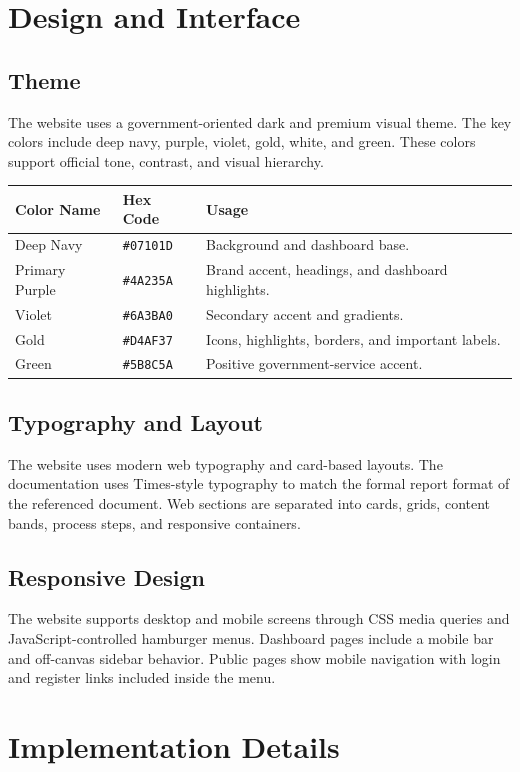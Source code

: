 \documentclass[12pt,a4paper]{report}
\begin{document}
\chapter{Design and Interface}
\section{Theme}
The website uses a government-oriented dark and premium visual theme. The key colors include deep navy, purple, violet, gold, white, and green. These colors support official tone, contrast, and visual hierarchy.

\begin{longtable}{|p{1.7in}|p{1.5in}|p{2.2in}|}
\hline
\textbf{Color Name} & \textbf{Hex Code} & \textbf{Usage} \\
\hline
Deep Navy & \texttt{\#07101D} & Background and dashboard base. \\
\hline
Primary Purple & \texttt{\#4A235A} & Brand accent, headings, and dashboard highlights. \\
\hline
Violet & \texttt{\#6A3BA0} & Secondary accent and gradients. \\
\hline
Gold & \texttt{\#D4AF37} & Icons, highlights, borders, and important labels. \\
\hline
Green & \texttt{\#5B8C5A} & Positive government-service accent. \\
\hline
\end{longtable}

\section{Typography and Layout}
The website uses modern web typography and card-based layouts. The documentation uses Times-style typography to match the formal report format of the referenced document. Web sections are separated into cards, grids, content bands, process steps, and responsive containers.

\section{Responsive Design}
The website supports desktop and mobile screens through CSS media queries and JavaScript-controlled hamburger menus. Dashboard pages include a mobile bar and off-canvas sidebar behavior. Public pages show mobile navigation with login and register links included inside the menu.

\chapter{Implementation Details}
\end{document}
